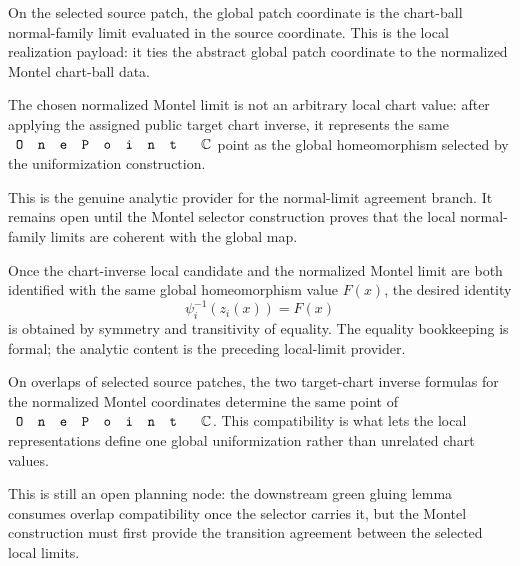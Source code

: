 \begin{lemma}
\label{lem:montel-selector-chartball-value-represents-local-coordinate}
On the selected source patch, the global patch coordinate is the chart-ball
normal-family limit evaluated in the source coordinate.  This is the local
realization payload: it ties the abstract global patch coordinate to the
normalized Montel chart-ball data.
\end{lemma}

\begin{lemma}
\label{lem:montel-selector-local-limit-tied-to-global-homeomorphism}
The chosen normalized Montel limit is not an arbitrary local chart value: after
applying the assigned public target chart inverse, it represents the same
\(\code{OnePoint}\,\C\) point as the global homeomorphism selected by the
uniformization construction.

This is the genuine analytic provider for the normal-limit agreement branch.
It remains open until the Montel selector construction proves that the local
normal-family limits are coherent with the global map.
\end{lemma}

\begin{lemma}
\label{lem:montel-selector-normal-limit-equality-bookkeeping}
Once the chart-inverse local candidate and the normalized Montel limit are both
identified with the same global homeomorphism value \(F(x)\), the desired
identity
\[
  \psi_i^{-1}(z_i(x)) = F(x)
\]
is obtained by symmetry and transitivity of equality.  The equality
bookkeeping is formal; the analytic content is the preceding local-limit
provider.
\end{lemma}

\begin{lemma}
\label{lem:montel-selector-overlap-compatible-normalized-values}
On overlaps of selected source patches, the two target-chart inverse formulas
for the normalized Montel coordinates determine the same point of
\(\code{OnePoint}\,\C\).  This compatibility is what lets the local
representations define one global uniformization rather than unrelated chart
values.

This is still an open planning node: the downstream green gluing lemma consumes
overlap compatibility once the selector carries it, but the Montel construction
must first provide the transition agreement between the selected local limits.
\end{lemma}

